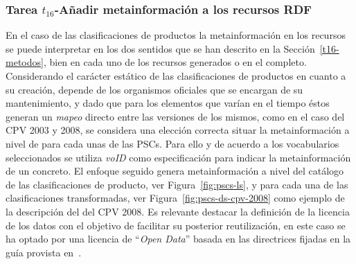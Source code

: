 \subsubsection{Tarea $t_{16}$-Añadir metainformación a los recursos RDF}\label{t16-pscs}
En el caso de las clasificaciones de productos la metainformación en los recursos se puede 
interpretar en los dos sentidos que se han descrito en la Sección~\ref{t16-metodos}, bien 
en cada uno de los recursos generados o en el \dataset completo. Considerando el carácter 
estático de las clasificaciones de productos en cuanto a su creación, depende de los organismos oficiales que 
se encargan de su mantenimiento, y dado que para los elementos que varían en el tiempo éstos 
generan un \textit{mapeo} directo entre las versiones de los mismos, como en el caso del CPV 2003 y 2008, se considera 
una elección correcta situar la metainformación a nivel de \dataset para cada unas de las PSCs. Para ello y de acuerdo 
a los vocabularios seleccionados se utiliza \textit{\gls{voID}} como especificación para indicar la metainformación 
de un \dataset concreto. El enfoque seguido genera metainformación a nivel del catálogo de las clasificaciones 
de producto, ver Figura~\ref{fig:pscs-ls}, y para cada una de las clasificaciones transformadas, ver Figura~\ref{fig:pscs-ds-cpv-2008} como ejemplo 
de la descripción del \dataset del \gls{CPV} 2008. Es relevante destacar la definición de la licencia de los datos con el objetivo 
de facilitar su posterior reutilización, en este caso se ha optado por una licencia de ``\textit{Open Data}'' basada en las directrices 
fijadas en la guía provista en~\cite{od-license}.

